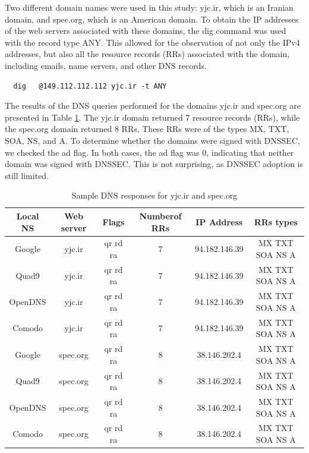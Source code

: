 \documentclass[eng]{class}
\begin{document}
Two different domain names were used in this study: yjc.ir, which is an Iranian domain, and spec.org, which is an American domain.
To obtain the IP addresses of the web servers associated with these domains, the dig command was used with the record type ANY.
This allowed for the observation of not only the IPv4 addresses, but also all the resource records (RRs) associated with the domain, including emails, name servers, and other DNS records.
\begin{lstlisting}
  dig   @149.112.112.112 yjc.ir -t ANY
\end{lstlisting}
The results of the DNS queries performed for the domains yjc.ir and spec.org are presented in Table \ref*{tab-4}.
The yjc.ir domain returned 7 resource records (RRs), while the spec.org domain returned 8 RRs.
These RRs were of the types MX, TXT, SOA, NS, and A. To determine whether the domains were signed with DNSSEC, we checked the ad flag.
In both cases, the ad flag was 0, indicating that neither domain was signed with DNSSEC.
This is not surprising, as DNSSEC adoption is still limited.
\begin{table}[H]
    \tiny
    \begin{tabular}{|c|c|c|c|c|c|}
        \hline
        \linewidth=0cm
        Local NS & Web server & Flags    & Numberof RRs & IP Address    & RRs types       \\
        \hline
        Google   & yjc.ir     & qr rd ra & 7            & 94.182.146.39 & MX TXT SOA NS A \\
        Quad9    & yjc.ir     & qr rd ra & 7            & 94.182.146.39 & MX TXT SOA NS A \\
        OpenDNS  & yjc.ir     & qr rd ra & 7            & 94.182.146.39 & MX TXT SOA NS A \\
        Comodo   & yjc.ir     & qr rd ra & 7            & 94.182.146.39 & MX TXT SOA NS A \\
        Google   & spec.org   & qr rd ra & 8            & 38.146.202.4  & MX TXT SOA NS A \\
        Quad9    & spec.org   & qr rd ra & 8            & 38.146.202.4  & MX TXT SOA NS A \\
        OpenDNS  & spec.org   & qr rd ra & 8            & 38.146.202.4  & MX TXT SOA NS A \\
        Comodo   & spec.org   & qr rd ra & 8            & 38.146.202.4  & MX TXT SOA NS A \\
        \hline
    \end{tabular}
    \caption{Sample DNS responses for yjc.ir and spec.org}
    \label{tab-4}
\end{table}
\end{document}
